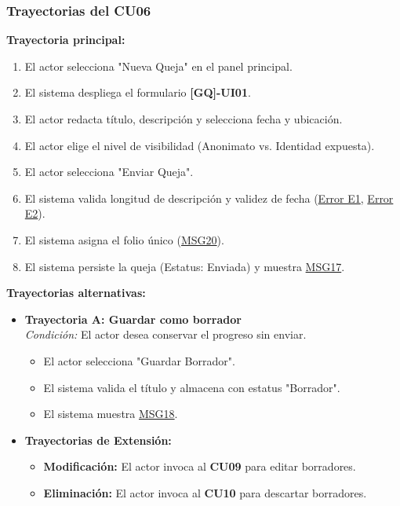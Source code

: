 \begin{appendices}
\subsubsection{Trayectorias del CU06}

\textbf{Trayectoria principal:}
\begin{enumerate}[nosep]
    \item El actor selecciona "Nueva Queja" en el panel principal.
    \item El sistema despliega el formulario \textbf{[GQ]-UI01}.
    \item El actor redacta título, descripción y selecciona fecha y ubicación.
    \item El actor elige el nivel de visibilidad (Anonimato vs. Identidad expuesta).
    \item El actor selecciona "Enviar Queja".
    \item El sistema valida longitud de descripción y validez de fecha (\hyperlink{err:E10}{Error E1}, \hyperlink{err:E11}{Error E2}).
    \item El sistema asigna el folio único (\hyperlink{msg:MSG20}{MSG20}).
    \item El sistema persiste la queja (Estatus: Enviada) y muestra \hyperlink{msg:MSG17}{MSG17}.
\end{enumerate}

\textbf{Trayectorias alternativas:}
\begin{itemize}[leftmargin=*]
    \item \textbf{Trayectoria A: Guardar como borrador} \\
    \textit{Condición:} El actor desea conservar el progreso sin enviar.
    \begin{itemize}[nosep]
        \item[A-1:] El actor selecciona "Guardar Borrador".
        \item[A-2:] El sistema valida el título y almacena con estatus "Borrador".
        \item[A-3:] El sistema muestra \hyperlink{msg:MSG18}{MSG18}.
    \end{itemize}
    \item \textbf{Trayectorias de Extensión:}
    \begin{itemize}[nosep]
        \item \textbf{Modificación:} El actor invoca al \textbf{CU09} para editar borradores.
        \item \textbf{Eliminación:} El actor invoca al \textbf{CU10} para descartar borradores.
    \end{itemize}
\end{itemize}


\end{appendices}
